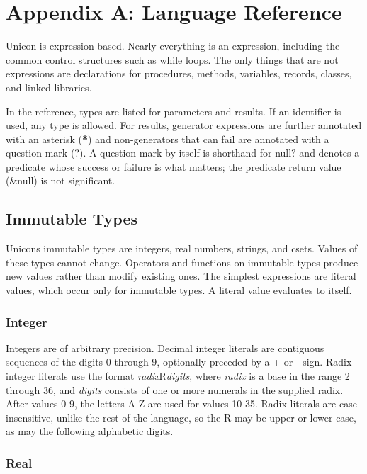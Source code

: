\clearpage\section{Appendix A: Language Reference}

Unicon is expression-based. Nearly everything is an expression,
including the common control structures such
as while loops. The only things that are not expressions are
declarations for procedures, methods, variables, records, classes, and
linked libraries.

In the reference, types are listed for parameters and results. If an
identifier is used, any type is allowed. For results,
generator expressions are further annotated with an
asterisk (\textsf{\textbf{*}}) and non-generators that can
fail are annotated with a question mark
(\textsf{?}). A question mark by itself is shorthand for \textsf{null?}
and denotes a predicate whose success or failure is what matters; the
predicate return value (\textsf{\&null}) is not significant.

\subsection{Immutable Types}

Unicon{\textquotesingle}s immutable types are integers, real numbers,
strings, and csets. Values of these types cannot change. Operators and
functions on immutable types produce new values rather than modify
existing ones. The simplest expressions are literal values, which occur
only for immutable types. A literal value evaluates to itself.

\subsubsection{Integer}

Integers are of arbitrary precision. Decimal integer
literals are contiguous sequences of the digits 0 through 9, optionally
preceded by a + or - sign. Radix integer literals use the format
\textit{radix}R\textit{digits}, where \textit{radix} is a base in the
range 2 through 36, and \textit{digits} consists of one or more
numerals in the supplied radix. After values 0-9, the letters A-Z are
used for values 10-35. Radix literals are case insensitive, unlike the
rest of the language, so the R may be upper or lower case, as may the
following alphabetic digits.

\subsubsection{Real}

